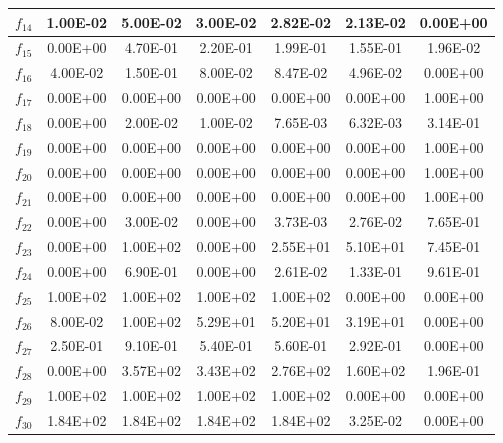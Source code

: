 \begin{table}[t]
\begin{scriptsize}
\begin{tabular}{|c|c|c|c|c|c|c|}
$f_{14}$ & 1.00E-02 & 5.00E-02 & 3.00E-02 & 2.82E-02 & 2.13E-02 & 0.00E+00 \\ \hline
$f_{15}$ & 0.00E+00 & 4.70E-01 & 2.20E-01 & 1.99E-01 & 1.55E-01 & 1.96E-02 \\ \hline
$f_{16}$ & 4.00E-02 & 1.50E-01 & 8.00E-02 & 8.47E-02 & 4.96E-02 & 0.00E+00 \\ \hline
$f_{17}$ & 0.00E+00 & 0.00E+00 & 0.00E+00 & 0.00E+00 & 0.00E+00 & 1.00E+00 \\ \hline
$f_{18}$ & 0.00E+00 & 2.00E-02 & 1.00E-02 & 7.65E-03 & 6.32E-03 & 3.14E-01 \\ \hline
$f_{19}$ & 0.00E+00 & 0.00E+00 & 0.00E+00 & 0.00E+00 & 0.00E+00 & 1.00E+00 \\ \hline
$f_{20}$ & 0.00E+00 & 0.00E+00 & 0.00E+00 & 0.00E+00 & 0.00E+00 & 1.00E+00 \\ \hline
$f_{21}$ & 0.00E+00 & 0.00E+00 & 0.00E+00 & 0.00E+00 & 0.00E+00 & 1.00E+00 \\ \hline
$f_{22}$ & 0.00E+00 & 3.00E-02 & 0.00E+00 & 3.73E-03 & 2.76E-02 & 7.65E-01 \\ \hline
$f_{23}$ & 0.00E+00 & 1.00E+02 & 0.00E+00 & 2.55E+01 & 5.10E+01 & 7.45E-01 \\ \hline
$f_{24}$ & 0.00E+00 & 6.90E-01 & 0.00E+00 & 2.61E-02 & 1.33E-01 & 9.61E-01 \\ \hline
$f_{25}$ & 1.00E+02 & 1.00E+02 & 1.00E+02 & 1.00E+02 & 0.00E+00 & 0.00E+00 \\ \hline
$f_{26}$ & 8.00E-02 & 1.00E+02 & 5.29E+01 & 5.20E+01 & 3.19E+01 & 0.00E+00 \\ \hline
$f_{27}$ & 2.50E-01 & 9.10E-01 & 5.40E-01 & 5.60E-01 & 2.92E-01 & 0.00E+00 \\ \hline
$f_{28}$ & 0.00E+00 & 3.57E+02 & 3.43E+02 & 2.76E+02 & 1.60E+02 & 1.96E-01 \\ \hline
$f_{29}$ & 1.00E+02 & 1.00E+02 & 1.00E+02 & 1.00E+02 & 0.00E+00 & 0.00E+00 \\ \hline
$f_{30}$ & 1.84E+02 & 1.84E+02 & 1.84E+02 & 1.84E+02 & 3.25E-02 & 0.00E+00 \\ \hline
\end{tabular}%
\end{scriptsize}
\end{table}

